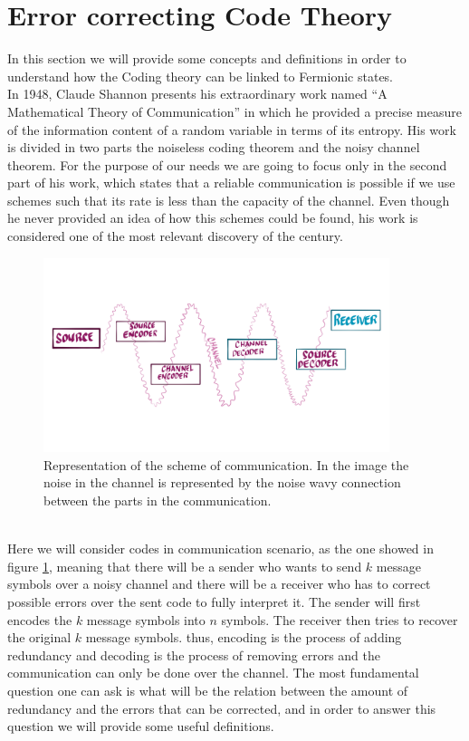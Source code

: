 \section{Error correcting Code Theory}
In this section we will provide some concepts and definitions in order to understand how the Coding theory can be linked to Fermionic states.\\
In 1948, Claude Shannon presents his extraordinary work named ``A Mathematical Theory of Communication'' \cite{shannon_mathematical_1948} in which he provided a precise measure of the information content of a random variable in terms of its entropy.  His work is divided in two parts the noiseless coding theorem and the noisy channel theorem. For the purpose of our needs we are going to focus only in the second part of his work, which states that a reliable communication is possible if we use schemes such that its rate is less than the capacity of the channel. Even though he never provided an idea of how this schemes could be found, his work is considered one of the most relevant discovery of the century.\\
\begin{figure}
\centering
\includegraphics[width=0.9\textwidth]{Figures/Source_Destination.png}
\caption{Representation of the scheme of communication. In the image the noise in the channel is represented by the noise wavy connection between the parts in the communication. }
\label{CH2:Channel_communication}
\end{figure}
\\
Here we will consider codes in communication scenario, as the one showed in figure \ref{CH2:Channel_communication}, meaning that there will be a sender who wants to send $k$ message symbols over a noisy channel and there will be a receiver who has to correct possible errors over the sent code to fully interpret it. The sender will first encodes the $k$ message symbols into $n$ symbols. The receiver then tries to recover the original $k$ message symbols. thus, encoding is the process of adding redundancy and decoding is the process of removing errors and the communication can only be done over the channel\cite{mackay_information_2003}. The most fundamental question one can ask is what will be the relation between the amount of redundancy and the errors that can be corrected, and in order to answer this question we will provide some useful definitions.\\
